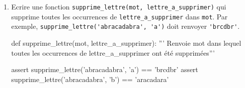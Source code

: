 \begin{exercice_cours}
\begin{enumerate}
\begin{CodePythontexAlt}[TaillePolice=\normalsize, Largeur=1\linewidth,Centre,PremLigne=1,Lignes=false,]{}
					


					

				assert remplace_lettre('abracadabra', 'a', 'o') == 'obrocodobro'
				assert remplace_lettre('abracadabra', 'b', 'x') == 'axracadaxra'
				\end{CodePythontexAlt}
			
			\item Ecrire une fonction \verb|supprime_lettre(mot, lettre_a_supprimer)| qui supprime toutes les occurrences de \verb|lettre_a_supprimer| dans \verb|mot|. Par exemple, \verb|supprime_lettre('abracadabra', 'a')| doit renvoyer \verb+'brcdbr'+.	
			\begin{CodePythontexAlt}[TaillePolice=\normalsize, Largeur=1\linewidth,Centre,PremLigne=1,Lignes=false,]{}
				def supprime_lettre(mot, lettre_a_supprimer):
					''' Renvoie mot dans lequel toutes les occurrences de 
					lettre_a_supprimer ont été supprimées'''
					


					


					
					
					
					
					
				assert supprime_lettre('abracadabra', 'a') == 'brcdbr'
				assert supprime_lettre('abracadabra', 'b') == 'aracadara'

				\end{CodePythontexAlt}
		\end{enumerate}
	\end{exercice_cours}
